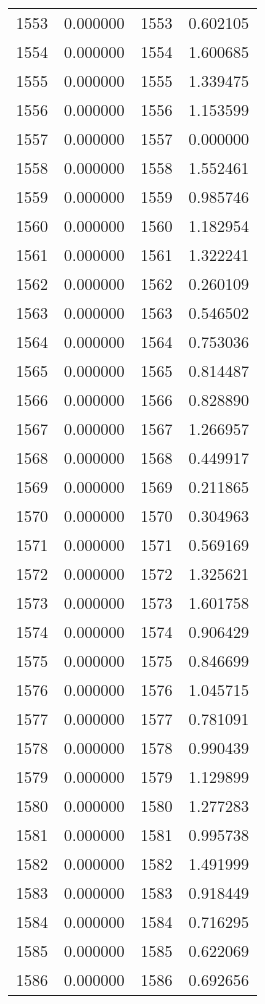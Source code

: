 \documentclass[12pt]{article}
\begin{document}
\begin{longtable}{@{}cccc@{}}
1553 & 0.000000 & 1553 & 0.602105 \\
1554 & 0.000000 & 1554 & 1.600685 \\
1555 & 0.000000 & 1555 & 1.339475 \\
1556 & 0.000000 & 1556 & 1.153599 \\
1557 & 0.000000 & 1557 & 0.000000 \\
1558 & 0.000000 & 1558 & 1.552461 \\
1559 & 0.000000 & 1559 & 0.985746 \\
1560 & 0.000000 & 1560 & 1.182954 \\
1561 & 0.000000 & 1561 & 1.322241 \\
1562 & 0.000000 & 1562 & 0.260109 \\
1563 & 0.000000 & 1563 & 0.546502 \\
1564 & 0.000000 & 1564 & 0.753036 \\
1565 & 0.000000 & 1565 & 0.814487 \\
1566 & 0.000000 & 1566 & 0.828890 \\
1567 & 0.000000 & 1567 & 1.266957 \\
1568 & 0.000000 & 1568 & 0.449917 \\
1569 & 0.000000 & 1569 & 0.211865 \\
1570 & 0.000000 & 1570 & 0.304963 \\
1571 & 0.000000 & 1571 & 0.569169 \\
1572 & 0.000000 & 1572 & 1.325621 \\
1573 & 0.000000 & 1573 & 1.601758 \\
1574 & 0.000000 & 1574 & 0.906429 \\
1575 & 0.000000 & 1575 & 0.846699 \\
1576 & 0.000000 & 1576 & 1.045715 \\
1577 & 0.000000 & 1577 & 0.781091 \\
1578 & 0.000000 & 1578 & 0.990439 \\
1579 & 0.000000 & 1579 & 1.129899 \\
1580 & 0.000000 & 1580 & 1.277283 \\
1581 & 0.000000 & 1581 & 0.995738 \\
1582 & 0.000000 & 1582 & 1.491999 \\
1583 & 0.000000 & 1583 & 0.918449 \\
1584 & 0.000000 & 1584 & 0.716295 \\
1585 & 0.000000 & 1585 & 0.622069 \\
1586 & 0.000000 & 1586 & 0.692656 \\

\end{longtable}
\end{document}
